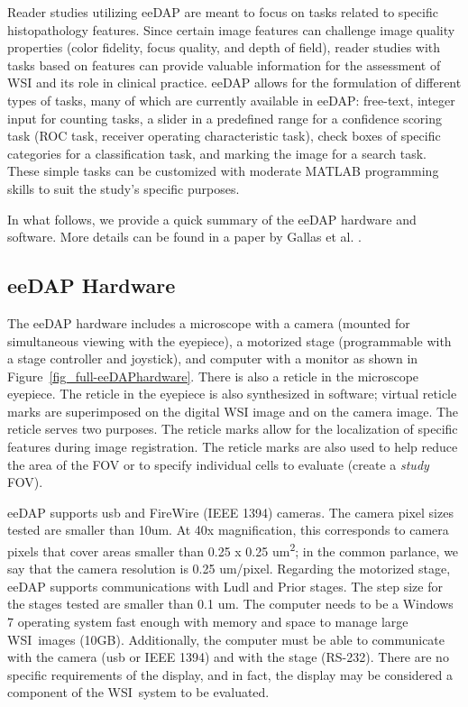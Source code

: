 \documentclass{article}%
\begin{document}
Reader studies utilizing eeDAP are meant to focus on tasks related to specific
histopathology features. Since certain image features can challenge image
quality properties (color fidelity, focus quality, and depth of field), reader
studies with tasks based on features can provide valuable information for the
assessment of WSI and its role in clinical practice. eeDAP allows for the
formulation of different types of tasks, many of which are currently available
in eeDAP: free-text, integer input for counting tasks, a slider in a
predefined range for a confidence scoring task (ROC task, receiver operating
characteristic task), check boxes of specific categories for a classification
task, and marking the image for a search task. These simple tasks can be
customized with moderate MATLAB programming skills to suit the study's
specific purposes.

In what follows, we provide a quick summary of the eeDAP hardware and
software. More details can be found in a paper by Gallas et al.
\cite{Gallas2014_J-Med-Img_v1p037501}.

\subsection{eeDAP Hardware}

\label{eedap-hardware}

The eeDAP hardware includes a microscope with a camera (mounted for
simultaneous viewing with the eyepiece), a motorized stage (programmable with
a stage controller and joystick), and computer with a monitor as shown in
Figure~\ref{fig_full-eeDAPhardware}. There is also a reticle in the microscope
eyepiece. The reticle in the eyepiece is also synthesized in software; virtual
reticle marks are superimposed on the digital WSI image and on the camera
image. The reticle serves two purposes. The reticle marks allow for the
localization of specific features during image registration. The reticle marks
are also used to help reduce the area of the FOV or to specify individual
cells to evaluate (create a \emph{study} FOV).

eeDAP supports usb and FireWire (IEEE 1394) cameras. The camera pixel sizes
tested are smaller than 10um. At 40x magnification, this corresponds to camera
pixels that cover areas smaller than 0.25 x 0.25 um\textsuperscript{2}; in the
common parlance, we say that the camera resolution is 0.25 um/pixel. Regarding
the motorized stage, eeDAP supports communications with Ludl and Prior stages.
The step size for the stages tested are smaller than 0.1 um. The computer
needs to be a Windows 7 operating system fast enough with memory and space to
manage large WSI\ images (10GB). Additionally, the computer must
be able to communicate with the camera (usb or IEEE 1394) and with the stage
(RS-232). There are no specific requirements of the display, and in fact, the
display may be considered a component of the WSI\ system to be evaluated.
\end{document}
